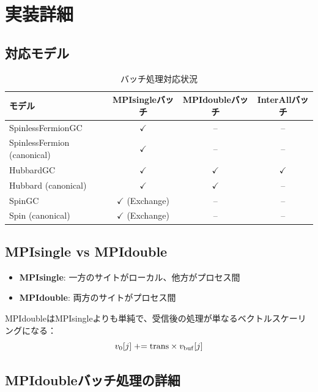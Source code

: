 \documentclass[11pt,a4paper]{article}
\begin{document}
\section{実装詳細}

\subsection{対応モデル}

\begin{table}[h]
\centering
\begin{tabular}{lccc}
\toprule
モデル & MPIsingleバッチ & MPIdoubleバッチ & InterAllバッチ \\
\midrule
SpinlessFermionGC & $\checkmark$ & -- & -- \\
SpinlessFermion (canonical) & $\checkmark$ & -- & -- \\
HubbardGC & $\checkmark$ & $\checkmark$ & $\checkmark$ \\
Hubbard (canonical) & $\checkmark$ & $\checkmark$ & -- \\
SpinGC & $\checkmark$ (Exchange) & -- & -- \\
Spin (canonical) & $\checkmark$ (Exchange) & -- & -- \\
\bottomrule
\end{tabular}
\caption{バッチ処理対応状況}
\end{table}

\subsection{MPIsingle vs MPIdouble}

\begin{itemize}
  \item \textbf{MPIsingle}: 一方のサイトがローカル、他方がプロセス間
  \item \textbf{MPIdouble}: 両方のサイトがプロセス間
\end{itemize}

MPIdoubleはMPIsingleよりも単純で、受信後の処理が単なるベクトルスケーリングになる：
\begin{equation}
  v_0[j] \mathrel{+}= \text{trans} \times v_{\rm buf}[j]
\end{equation}

\subsection{MPIdoubleバッチ処理の詳細}
\end{document}
